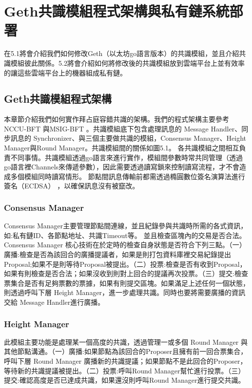 \chapter{Geth共識模組程式架構與私有鏈系統部署}\label{se_5}
在5.1將會介紹我們如何修改Geth（以太坊go語言版本）的共識模組，並且介紹共識模組彼此關係。5.2將會介紹如何將修改後的共識模組放到雲端平台上並有效率的讓這些雲端平台上的機器組成私有鏈。
\section{Geth共識模組程式架構}\label{se_5}
本章節介紹我們如何實作拜占庭容錯共識的架構。我們的程式架構主要參考NCCU-BFT \cite{nccubft}與MSIG-BFT \cite{chen2018msig}。共識模組底下包含處理訊息的 Message Handler、同步訊息的 Synchronizer、與三個主要做共識的模組，Consensus Manager、Height Manager與Round Manager。共識模組間的關係如圖5.1。
各共識模組之間相互負責不同事情。共識模組透過go語言來進行實作，模組間參數時常共同管理（透過 go語言裡Channels來傳遞參數），因此需要透過讀寫鎖來控制讀寫流程，才不會造成多個模組同時讀寫情形。
節點間訊息傳輸前都需透過橢圓數位簽名演算法進行簽名（ECDSA） \cite{ecdsa}，以確保訊息沒有被竄改。  



\newpage

\subsection{Consensus Manager}\label{se_5} 
Consensus Manager主要管理節點間連線，並且紀錄參與共識時所需的各式資訊，如:私有鏈ID、各節點地址、共識Timeout等。
並且檢查區塊內的交易是否合法。Consensus Manager 核心技術在於定時的檢查自身狀態是否符合下列三點。（一）廣播:檢查是否為該回合的廣播提議者，如果是則打包資料庫裡交易紀錄提出Proposal;如果不是則等待Proposal被提出。（二）投票:檢查是否有收到Proposal，如果有則檢查是否合法；如果沒收到則對上回合的提議再次投票。（三）提交:檢查票集合是否有足夠票數的票據，如果有則提交區塊。如果滿足上述任何一個狀態，則透過呼叫下層 Height Manager，進一步處理共識。同時也要將需要廣播的資訊交給 Message Handler進行廣播。
\subsection{Height Manager}\label{se_5}
此模組主要功能是處理某一個高度的共識，透過管理一或多個 Round Manager 與其他節點溝通。（一）廣播:如果節點為該回合的Proposer且擁有前一回合票集合，呼叫下層 Round Manager 廣播新的共識提議；如果節點不是此回合的Proposer，等待新的共識提議被提出。（二）投票:呼叫Round Manager幫忙進行投票。（三）提交:確認高度是否已達成共識，如果還沒則呼叫Round Manager進行提交共識。

